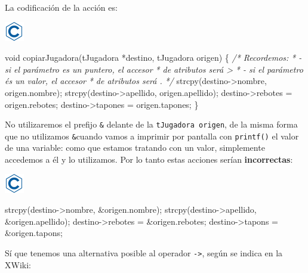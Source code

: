 \documentclass[
]{book}
\newenvironment{Shaded}{\begin{snugshade}}{\end{snugshade}}
\newcommand{\CommentTok}[1]{\textcolor[rgb]{0.56,0.35,0.01}{\textit{#1}}}
\newcommand{\DataTypeTok}[1]{\textcolor[rgb]{0.13,0.29,0.53}{#1}}
\newcommand{\NormalTok}[1]{#1}
\begin{document}
La codificación de la acción es:

\includegraphics{./img/c.png}

\begin{Shaded}
\begin{Highlighting}[]
\DataTypeTok{void}\NormalTok{ copiarJugadora(tJugadora *destino, tJugadora origen) \{}
    \CommentTok{/* Recordemos: }
\CommentTok{     * {-} si el parámetro es un puntero, el accesor}
\CommentTok{     * de atributos será \textquotesingle{}{-}\textgreater{}\textquotesingle{}}
\CommentTok{     * {-} si el parámetro és un valor, el accesor}
\CommentTok{     * de atributos será \textquotesingle{}.\textquotesingle{}}
\CommentTok{     */}
\NormalTok{    strcpy(destino{-}\textgreater{}nombre, origen.nombre);}
\NormalTok{    strcpy(destino{-}\textgreater{}apellido, origen.apellido);}
\NormalTok{    destino{-}\textgreater{}rebotes = origen.rebotes;}
\NormalTok{    destino{-}\textgreater{}tapones = origen.tapones;}
\NormalTok{\}}
\end{Highlighting}
\end{Shaded}

No utilizaremos el prefijo \texttt{\&} delante de la \texttt{tJugadora\ origen}, de la misma forma que no utilizamos \texttt{\&}cuando vamos a imprimir por pantalla con \texttt{printf()} el valor de una variable: como que estamos tratando con un valor, simplemente accedemos a él y lo utilizamos. Por lo tanto estas acciones serían \textbf{incorrectas}:

\includegraphics{./img/c.png}

\begin{Shaded}
\begin{Highlighting}[]
\NormalTok{    strcpy(destino{-}\textgreater{}nombre, \&origen.nombre);}
\NormalTok{    strcpy(destino{-}\textgreater{}apellido, \&origen.apellido);}
\NormalTok{    destino{-}\textgreater{}rebotes = \&origen.rebotes;}
\NormalTok{    destino{-}\textgreater{}tapons = \&origen.tapons;}
\end{Highlighting}
\end{Shaded}

Sí que tenemos una alternativa posible al operador \texttt{-\textgreater{}}, según se indica en la XWiki:
\end{document}
